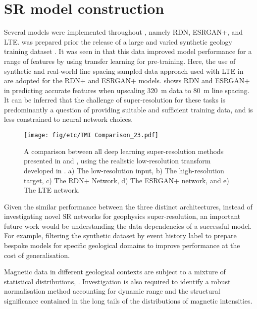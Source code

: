 \section{SR model construction}
Several models were implemented throughout , namely RDN, ESRGAN+, and LTE\@.
 was prepared prior the release of a large and varied synthetic geology training dataset \parencite{jessellNoddyverseMassiveData2022}.
It was seen in  that this data improved model performance for a range of features by using transfer learning for pre-training.
Here, the use of synthetic and real-world line spacing sampled data approach used with LTE in  are adopted for the RDN+ and ESRGAN+ models.
 shows RDN and ESRGAN+ in predicting accurate features when upscaling \qty{320}{\m} data to \qty{80}{\m} line spacing.
It can be inferred that the challenge of super-resolution for these tasks is predominantly a question of providing suitable and sufficient training data, and is less constrained to neural network choices.

\begin{figure}
    \texttt{[image: fig/etc/TMI Comparison\_23.pdf]} %
    \caption{
        A comparison between all deep learning super-resolution methods presented in  and , using the realistic low-resolution transform developed in .
        a) The low-resolution input, b) The high-resolution target, c) The RDN+ Network, d) The ESRGAN+ network, and e) The LTE network.}
    \label{fig:modcomp}
\end{figure}

Given the similar performance between the three distinct architectures, instead of investigating novel SR networks for geophysics super-resolution, an important future work would be understanding the data dependencies of a successful model. For example, filtering the synthetic dataset by event history label to prepare bespoke models for specific geological domains to improve performance at the cost of generalisation.

Magnetic data in different geological contexts are subject to a mixture of statistical distributions, \parencite{khokhlovCauseNonGaussianDistribution2017}. Investigation is also required to identify a robust normalisation method accounting for dynamic range and the structural significance contained in the long tails of the distributions of magnetic intensities.

